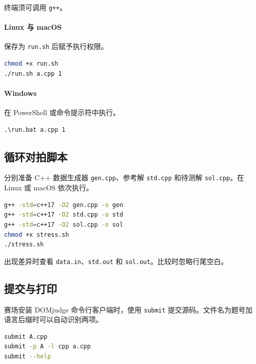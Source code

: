 终端须可调用 \texttt{g++}。

\paragraph{Linux 与 macOS}
保存为 \texttt{run.sh} 后赋予执行权限。

\begin{lstlisting}[language=bash,numbers=none]
chmod +x run.sh
./run.sh a.cpp 1
\end{lstlisting}


\paragraph{Windows}
在 PowerShell 或命令提示符中执行。

\begin{lstlisting}[language={},numbers=none]
.\run.bat a.cpp 1
\end{lstlisting}


\subsection{循环对拍脚本}

分别准备 C++ 数据生成器 \texttt{gen.cpp}、参考解 \texttt{std.cpp} 和待测解 \texttt{sol.cpp}。在 Linux 或 macOS 依次执行。

\begin{lstlisting}[language=bash,numbers=none]
g++ -std=c++17 -O2 gen.cpp -o gen
g++ -std=c++17 -O2 std.cpp -o std
g++ -std=c++17 -O2 sol.cpp -o sol
chmod +x stress.sh
./stress.sh
\end{lstlisting}

出现差异时查看 \texttt{data.in}、\texttt{std.out} 和 \texttt{sol.out}。比较时忽略行尾空白。


\subsection{提交与打印}

赛场安装 DOMjudge 命令行客户端时，使用 \texttt{submit} 提交源码。文件名为题号加语言后缀时可以自动识别两项。

\begin{lstlisting}[language=bash,numbers=none]
submit A.cpp
submit -p A -l cpp a.cpp
submit --help
\end{lstlisting}

